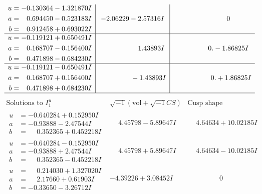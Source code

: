 \documentclass[1p]{elsarticle_modified}
\theoremstyle{definition}
\newcommand{\I}{\sqrt{-1}}
\begin{document}
$$\begin{array}{c|c|c}
\begin{aligned}
u &= -0.130364 - 1.321870 I \\
a &= \phantom{-}0.694450 - 0.523183 I \\
b &= \phantom{-}0.912458 + 0.693022 I\end{aligned}
 & -2.06229 - 2.57316 I & \phantom{-0.000000 } 0 \\ \hline\begin{aligned}
u &= -0.119121 + 0.650491 I \\
a &= \phantom{-}0.168707 - 0.156400 I \\
b &= \phantom{-}0.471898 - 0.684230 I\end{aligned}
 & \phantom{-0.000000 -}1.43893 I & \phantom{-0.000000 } 0. - 1.86825 I \\ \hline\begin{aligned}
u &= -0.119121 - 0.650491 I \\
a &= \phantom{-}0.168707 + 0.156400 I \\
b &= \phantom{-}0.471898 + 0.684230 I\end{aligned}
 & \phantom{-0.000000 } -1.43893 I & \phantom{-0.000000 -}0. + 1.86825 I\\
 \hline 
 \end{array}$$\newpage$$\begin{array}{c|c|c}  
\text{Solutions to }I^u_{1}& \I (\text{vol} + \sqrt{-1}CS) & \text{Cusp shape}\\
 \hline 
\begin{aligned}
u &= -0.640284 + 0.152950 I \\
a &= -0.93888 - 2.47544 I \\
b &= \phantom{-}0.352365 + 0.452218 I\end{aligned}
 & \phantom{-}4.45798 - 5.89647 I & \phantom{-}4.64634 + 10.02185 I \\ \hline\begin{aligned}
u &= -0.640284 - 0.152950 I \\
a &= -0.93888 + 2.47544 I \\
b &= \phantom{-}0.352365 - 0.452218 I\end{aligned}
 & \phantom{-}4.45798 + 5.89647 I & \phantom{-}4.64634 - 10.02185 I \\ \hline\begin{aligned}
u &= \phantom{-}0.214030 + 1.327020 I \\
a &= \phantom{-}2.17660 + 0.61903 I \\
b &= -0.33650 - 3.26712 I\end{aligned}
 & -4.39226 + 3.08452 I & \phantom{-0.000000 } 0 \\ \hline\begin{aligned}

\end{aligned}
\end{array}$$
\end{document}

